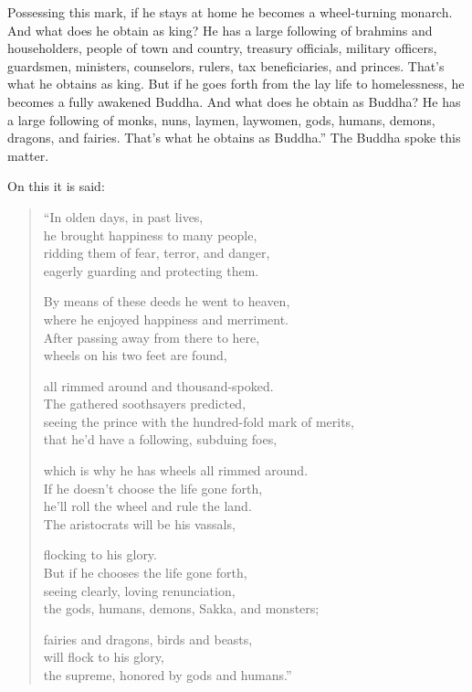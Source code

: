 \documentclass[12pt,openany]{book}%
\begin{document}
Possessing this mark, if he stays at home he becomes a wheel-turning monarch. And what does he obtain as king? He has a large following of brahmins and householders, people of town and country, treasury officials, military officers, guardsmen, ministers, counselors, rulers, tax beneficiaries, and princes. That’s what he obtains as king. But if he goes forth from the lay life to homelessness, he becomes a fully awakened Buddha. And what does he obtain as Buddha? He has a large following of monks, nuns, laymen, laywomen, gods, humans, demons, dragons, and fairies. That’s what he obtains as Buddha.” The Buddha spoke this matter. 

On this it is said: 

\begin{verse}%
“In olden days, in past lives, \\
he brought happiness to many people, \\
ridding them of fear, terror, and danger, \\
eagerly guarding and protecting them. 

By means of these deeds he went to heaven, \\
where he enjoyed happiness and merriment. \\
After passing away from there to here, \\
wheels on his two feet are found, 

all rimmed around and thousand-spoked. \\
The gathered soothsayers predicted, \\
seeing the prince with the hundred-fold mark of merits, \\
that he’d have a following, subduing foes, 

which is why he has wheels all rimmed around. \\
If he doesn’t choose the life gone forth, \\
he’ll roll the wheel and rule the land. \\
The aristocrats will be his vassals, 

flocking to his glory. \\
But if he chooses the life gone forth, \\
seeing clearly, loving renunciation, \\
the gods, humans, demons, Sakka, and monsters; 

fairies and dragons, birds and beasts, \\
will flock to his glory, \\
the supreme, honored by gods and humans.” 

%
\end{verse}
\end{document}
